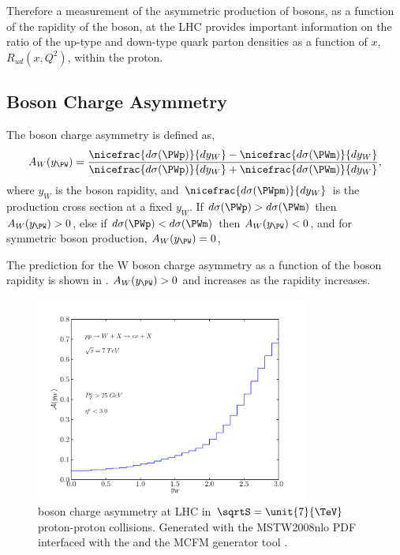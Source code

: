 Therefore a measurement of the asymmetric production of \PW bosons, as a
function of the rapidity of the boson, at the {LHC} provides important
information on the ratio of the up-type and down-type quark parton densities as
a function of $x$,
$R_{ud}(x,Q^2)$, within the proton. 

\subsection{\PW Boson Charge Asymmetry}

The \PWpm boson charge asymmetry is defined as,
\begin{equation}
  A_{W}(y_{\PW})=
    \frac{ 
      \nicefrac{ d\sigma (\PWp) }{ dy_{W} } -
      \nicefrac{ d\sigma (\PWm) }{ dy_{W} }
    }
    {
      \nicefrac{ d\sigma (\PWp) }{ dy_{W} } +
      \nicefrac{ d\sigma (\PWm) }{ dy_{W} }
    }
,
\label{wbos:wasym}
\end{equation} 
where $y_{W}$ is the boson rapidity, and 
$\nicefrac{ d\sigma (\PWpm) }{ dy_{W} }$ is the \PWpm production cross section
at a fixed $y_{W}$.  
If $d\sigma(\PWp) > d\sigma(\PWm) $ then $A_{W}(y_{\PW})> 0$,
else if $d\sigma(\PWp) < d\sigma(\PWm) $ then $A_{W}(y_{\PW})< 0$,
and for symmetric \PWpm boson production, $A_{W}(y_{\PW})= 0$,

The prediction for the W boson charge asymmetry as a function of the boson
rapidity is shown in . $A_{W}(y_{\PW})> 0$ and
increases as the rapidity increases.

\begin{figure}[htbp]
  \centering
  \includegraphics[width=0.8\textwidth]{w-asym}
  \caption{\PW boson charge asymmetry at LHC in $\sqrtS=\unit{7}{\TeV}$ proton-proton collisions. 
Generated with the MSTW2008nlo PDF\cite{martin2009parton} interfaced with the
and the MCFM generator tool \cite{campbellmcfm}.}
  \label{wbos:chargeasym}
\end{figure}

